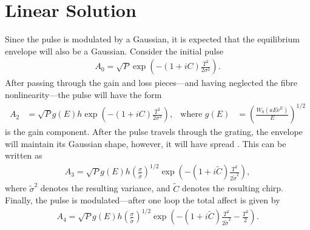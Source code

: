 \chapter{Linear Solution}

Since the pulse is modulated by a Gaussian, it is expected that the equilibrium envelope will also be a Gaussian. Consider the initial pulse
\begin{align*}
	A_0 = \sqrt{P} \exp \left( -(1 + iC) \frac{T^2}{2 \sigma^2} \right).
\end{align*}
After passing through the gain and loss pieces---and having neglected the fibre nonlinearity---the pulse will have the form
\begin{align*}
	A_2 &= \sqrt{P} g(E) h \exp \left( -(1 + iC) \frac{T^2}{2 \sigma^2} \right),& \text{where } g(E) &= \left( \frac{W_0(a E \textrm{e}^E)}{E} \right)^{1/2}
\end{align*}
is the gain component. After the pulse travels through the grating, the envelope will maintain its Gaussian shape, however, it will have spread \cite{agrawal2013}. This can be written as
\begin{align}
\label{linear1}
	A_3 = \sqrt{P} g(E) h \left( \frac{\sigma}{\widetilde{\sigma}} \right)^{1/2} \exp \left( -(1 + i \widetilde{C}) \frac{T^2}{2 \widetilde{\sigma}^2} \right),
\end{align}
where $\widetilde{\sigma}^2$ denotes the resulting variance, and $\widetilde{C}$ denotes the resulting chirp. Finally, the pulse is modulated---after one loop the total affect is given by
\begin{align}
\label{linear2}
	A_4 = \sqrt{P} g(E) h \left( \frac{\sigma}{\widetilde{\sigma}} \right)^{1/2} \exp \left( -(1 + i \widetilde{C}) \frac{T^2}{2 \widetilde{\sigma}^2} - \frac{T^2}{2} \right).
\end{align}

